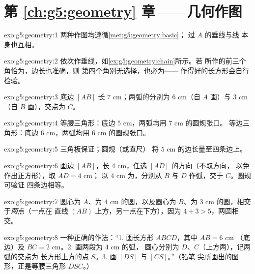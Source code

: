 \section*{第 \ref{ch:g5:geometry} 章——几何作图}

\begin{solution}{exo:g5:geometry:1}
两种作图均遵循\cref{met:g5:geometry:basic}；
过 $A$ 的垂线与线
本身也互相。
\end{solution}

\begin{solution}{exo:g5:geometry:2}
依次作垂线，如\cref{ex:g5:geometry:chain}所示。若
所作的前三个角恰为，边长也准确，则
第四个角别无选择，也必为——
作得好的长方形会自行检验。
\end{solution}

\begin{solution}{exo:g5:geometry:3}
底边 $[AB]$ 长 $7$ cm；两弧的分别为 $6$ cm（自 $A$ 画）与 $3$ cm
（自 $B$ 画），交点为 $C$。
\end{solution}

\begin{solution}{exo:g5:geometry:4}
等腰三角形：底边 $5$ cm，两弧均用 $7$ cm 的圆规张口。
等边三角形：底边 $6$ cm，两弧均用 $6$ cm 的圆规张口。
\end{solution}

\begin{solution}{exo:g5:geometry:5}
三角板保证；圆规（或直尺）
将 $5$ cm 的边长量至四条边上。
\end{solution}

\begin{solution}{exo:g5:geometry:6}
画边 $[AB]$，长 $4$ cm，任选 $[AD]$ 的方向（不取方向，
以免作出正方形），取 $AD = 4$ cm；
以 $4$ cm 为，分别从 $B$ 与 $D$ 作弧，交于 $C$。圆规可验证
四条边相等。
\end{solution}

\begin{solution}{exo:g5:geometry:7}
圆心为 $A$、为 $4$ cm 的圆，以及圆心为
$B$、为 $3$ cm 的圆，相交于\emph{两}点（一点在
直线 $(AB)$ 上方，另一点在下方），因为 $4 + 3 > 5$，两圆相交。
\end{solution}

\begin{solution}{exo:g5:geometry:8}
一种正确的作法：“1. 画长方形 $ABCD$，其中 $AB = 6$ cm
（底边）及 $BC = 2$ cm。2. 画两段为 $4$ cm 的弧，
圆心分别为 $D$、$C$（上方两），记两弧的交点为
长方形上方的点 $S$。3. 画 $[DS]$ 与 $[CS]$。”（铅笔
尖所画出的图形，正是等腰三角形 $DSC$。）
\end{solution}

